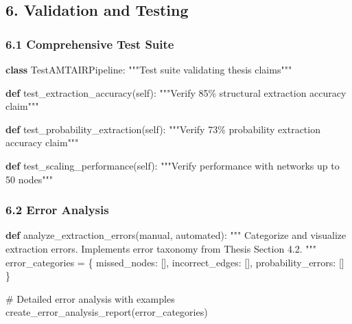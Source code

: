 \documentclass[
  11pt,
  letterpaper,
]{book}
\newenvironment{Shaded}{\begin{snugshade}}{\end{snugshade}}
\newcommand{\CommentTok}[1]{\textcolor[rgb]{0.37,0.37,0.37}{#1}}
\newcommand{\KeywordTok}[1]{\textcolor[rgb]{0.00,0.23,0.31}{\textbf{#1}}}
\newcommand{\NormalTok}[1]{\textcolor[rgb]{0.00,0.23,0.31}{#1}}
\newcommand{\OperatorTok}[1]{\textcolor[rgb]{0.37,0.37,0.37}{#1}}
\newcommand{\StringTok}[1]{\textcolor[rgb]{0.13,0.47,0.30}{#1}}
\newcommand{\VariableTok}[1]{\textcolor[rgb]{0.07,0.07,0.07}{#1}}
\begin{document}
\subsection{6. Validation and Testing}\label{validation-and-testing}

\subsubsection{6.1 Comprehensive Test
Suite}\label{comprehensive-test-suite}

\begin{Shaded}
\begin{Highlighting}[]
\KeywordTok{class}\NormalTok{ TestAMTAIRPipeline:}
    \CommentTok{"""Test suite validating thesis claims"""}
    
    \KeywordTok{def}\NormalTok{ test\_extraction\_accuracy(}\VariableTok{self}\NormalTok{):}
        \CommentTok{"""Verify 85\% structural extraction accuracy claim"""}
        
    \KeywordTok{def}\NormalTok{ test\_probability\_extraction(}\VariableTok{self}\NormalTok{):}
        \CommentTok{"""Verify 73\% probability extraction accuracy claim"""}
        
    \KeywordTok{def}\NormalTok{ test\_scaling\_performance(}\VariableTok{self}\NormalTok{):}
        \CommentTok{"""Verify performance with networks up to 50 nodes"""}
\end{Highlighting}
\end{Shaded}

\subsubsection{6.2 Error Analysis}\label{error-analysis}

\begin{Shaded}
\begin{Highlighting}[]
\KeywordTok{def}\NormalTok{ analyze\_extraction\_errors(manual, automated):}
    \CommentTok{"""}
\CommentTok{    Categorize and visualize extraction errors.}
\CommentTok{    Implements error taxonomy from Thesis Section 4.2.}
\CommentTok{    """}
\NormalTok{    error\_categories }\OperatorTok{=}\NormalTok{ \{}
        \StringTok{\textquotesingle{}missed\_nodes\textquotesingle{}}\NormalTok{: [],}
        \StringTok{\textquotesingle{}incorrect\_edges\textquotesingle{}}\NormalTok{: [],}
        \StringTok{\textquotesingle{}probability\_errors\textquotesingle{}}\NormalTok{: []}
\NormalTok{    \}}
    
    \CommentTok{\# Detailed error analysis with examples}
\NormalTok{    create\_error\_analysis\_report(error\_categories)}
\end{Highlighting}
\end{Shaded}
\end{document}
